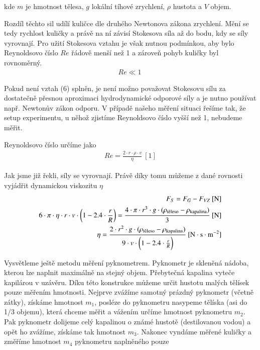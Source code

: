 \documentclass[a4paper]{article}
\begin{document}
kde $m$ je hmotnost tělesa, $g$ lokální tíhové zrychlení, $\rho$ hustota a $V$ objem.
\par Rozdíl těchto sil udílí kuličce dle druhého Newtonova zákona zrychlení. Mění se tedy rychlost kuličky a právě na ní závisí Stokesova síla až do bodu, kdy se síly vyrovnají. Pro užití Stokesova vztahu je však nutnou podmínkou, aby bylo Reynoldsovo číslo $Re$ řádově menší než 1 a zároveň pohyb kuličky byl rovnoměrný.
\begin{align}
Re \ll 1  \:
\end{align}
\par Pokud není vztah (6) splněn, je není možno považovat Stokesovu sílu za dostatečně přesnou aproximaci hydrodynamické odporové síly a je nutno používat např. Newtonův zákon odporu. V případě našeho měření situaci řešíme tak, že setup experimentu, u něhož zjistíme Reynoldsovo číslo vyšší než 1, nebudeme měřit.
\par Reynoldsovo číslo určíme jako
\begin{align}
Re = \frac{2 \cdot r \cdot \rho \cdot v}{\eta}  \: \mathrm{[1]}
\end{align}
\par Jak jsme již řekli, síly se vyrovnají. Právě díky tomu můžeme z dané rovnosti vyjádřit dynamickou viskozitu $\eta$
\begin{align}
F_{S} = F_{G} - F_{VZ}  \: \mathrm{[N]} \\
6 \cdot \pi \cdot \eta \cdot r \cdot v \cdot \bigg(1 - 2.4 \cdot \frac{r}{R} \bigg) = \frac{4 \cdot \pi \cdot r^{3} \cdot g  \cdot (\rho_{\textnormal{těleso}} - \rho_{\textnormal{kapalina}})}{3} \: \mathrm{[N]} \\
\eta = \frac{2 \cdot r^{2} \cdot g  \cdot (\rho_{\textnormal{těleso}} - \rho_{\textnormal{kapalina}})}{ 9 \cdot v \cdot \bigg(1 - 2.4 \cdot \frac{r}{R} \bigg)} \: \mathrm{[N \cdot s \cdot m^{-2}]}
\end{align}
\par Vysvětleme ještě metodu měření pyknometrem. Pyknometr je skleněná nádoba, kterou lze naplnit maximálně na stejný objem. Přebytečná kapalina vyteče kapilárou v uzávěru. Díku této konstrukce můžeme určit hustotu malých tělísek pouze měřením hmotnosti. Nejprve zvážíme samotný prázdný pyknometr (včetně zátky), získáme hmotnost $m_{1}$, posléze do pyknometru nasypeme tělíska (asi do 1/3 objemu), která chceme měřit a vážením určíme hmotnost pyknometru $m_{2}$. Pak pyknometr dolijeme celý kapalinou o známé hustotě (destilovanou vodou) a opět ho zvážíme, získáme tak hmotnost $m_{3}$. Nakonec vyndáme měřené kuličky a změříme hmotnost $m_{4}$ pyknometru naplněného pouze
\end{document}
